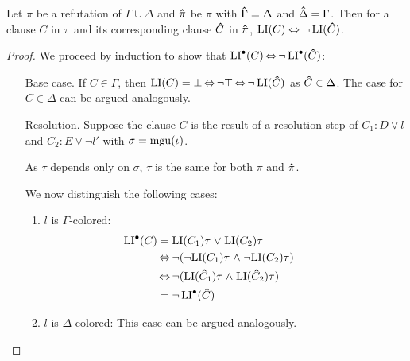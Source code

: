 \begin{lemma}
	\label{lemma:li_symmetry}
	Let $\pi$ be a refutation of $\Gamma\cup\Delta$ and $\bm\hat \pi$ be $\pi$ with $\bm\hat \Gamma = \Delta$ and $\bm\hat \Delta = \Gamma$.
	Then for a clause $C$ in $\pi$ and its corresponding clause $\bm\hat C$ in $\bm\hat \pi$, $\operatorname{LI}(C) \;{\operatorname{\Leftrightarrow}}\; \lnot \operatorname{LI}(\bm\hat C)$.
\end{lemma}
\begin{proof}
	We proceed by induction to show that $\operatorname{LI}^\bullet(C) \operatorname{\Leftrightarrow} \lnot \operatorname{LI}^\bullet(\bm\hat C)$:
	\begin{itemize}
		\item[Base case.]
			If $C \in \Gamma$, then $\operatorname{LI}(C) = \bot \operatorname{\Leftrightarrow} \lnot \top \operatorname{\Leftrightarrow} \lnot \operatorname{LI}(\bm\hat C)$ as $\bm\hat C\in\Delta$. 
			The case for $C\in\Delta$ can be argued analogously.

		\item[Resolution.]
			Suppose the clause $C$ is the result of a resolution step \inference{} of $C_1: D \lor l$ and $C_2: E \lor \lnot l'$ with $\sigma = \operatorname{mgu}(\iota)$.

			As $\tau$ depends only on $\sigma$,
			$\tau$ is the same for both $\pi$ and $\bm\hat \pi$.

			We now distinguish the following cases:

			\begin{enumerate}

				\item $l$ is $\Gamma$-colored:
					\begin{align*}
						\hspace*{\dimexpr-\leftmargini-\leftmarginii}
						\LIpre(C)	&= \LI(C_1)\tau\spas\lor {\LI(C_2)\tau} \\
															 &\semiff \lnot (\lnot{\LI(C_1)\tau}\spas\land \lnot {\LI(C_2)\tau}) \\
															 &\semiff \lnot ({\LI(\bhat C_1)\tau}\spas\land {\LI(\bhat C_2)\tau}) \\
															 &= \lnot \LIpre(\bhat C)
					\end{align*}

				\item $l$ is $\Delta$-colored:
					This case can be argued analogously.


\end{enumerate}
\end{itemize}
\end{proof}
